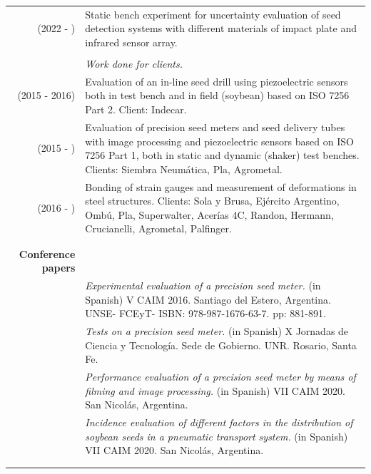 \documentclass[a4paper,10pt, sans]{article}
\begin{document}
  \begin{table}[H]
  \centering
  \begin{tabularx}{\textwidth}{r X}  
  		(2022 - ) & Static bench experiment for uncertainty evaluation of seed detection systems with different materials of impact plate and infrared sensor array.\\ \\
        {} & \hspace{2cm} \textit{Work done for clients.} \\ [1ex]
        (2015 - 2016) & Evaluation of an in-line seed drill using piezoelectric sensors both in test bench and in field (soybean) based on ISO 7256 Part 2. Client: Indecar. \\  [1ex]

        (2015 - ) & Evaluation of precision seed meters and seed delivery tubes with image processing and piezoelectric sensors based on ISO 7256 Part 1, both in static and dynamic (shaker) test benches. Clients: Siembra Neumática, Pla, Agrometal. \\ [1ex]
        (2016 - ) & Bonding of strain gauges and measurement of deformations in steel structures. Clients: Sola y Brusa, Ejército Argentino, Ombú, Pla, Superwalter, Acerías 4C, Randon, Hermann, Crucianelli, Agrometal, Palfinger. \\ \\ \hline \\

    \textbf{Conference papers} & {}\\ [1ex]
      {} & \textit{Experimental evaluation of a precision seed meter.} (in Spanish) V CAIM 2016. Santiago del Estero, Argentina. UNSE- FCEyT- ISBN: 978-987-1676-63-7. pp: 881-891. \\  [1ex]
      {} & \textit{Tests on a precision seed meter.} (in Spanish) X Jornadas de Ciencia y Tecnología. Sede de Gobierno. UNR. Rosario, Santa Fe. \\  [1ex]
      {} & \textit{Performance evaluation of a precision seed meter by means of filming and image processing.} (in Spanish) VII CAIM 2020. San Nicolás, Argentina. \\  [1ex]
      {} & \textit{Incidence evaluation of different factors in the distribution of soybean seeds in a pneumatic transport system.} (in Spanish)  VII CAIM 2020. San Nicolás, Argentina. \\ \\ \hline \\
      

\end{tabularx}
\end{table}
\end{document}
